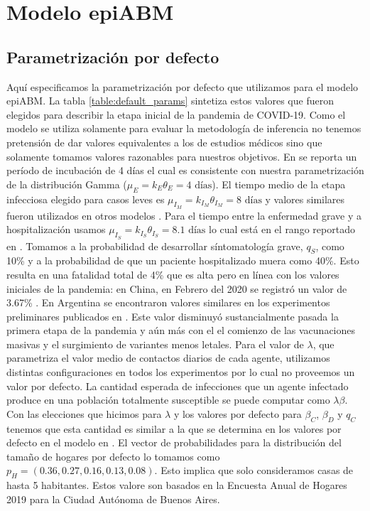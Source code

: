 \chapter{Modelo epiABM}
\section{Parametrización por defecto}\label{appendix:epi_abm_default_params}

Aquí especificamos la parametrización por defecto que utilizamos para el modelo epiABM. La tabla \ref{table:default_params} sintetiza estos valores que fueron elegidos para describir la etapa inicial de la pandemia de COVID-19. Como el modelo se utiliza solamente para evaluar la metodología de inferencia no tenemos pretensión de dar valores equivalentes a los de estudios médicos sino que solamente tomamos valores razonables para nuestros objetivos. En \cite{Guan2020} se reporta un período de incubación de 4 días el cual es consistente con nuestra parametrización de la distribución Gamma ($\mu_E = k_E \theta_E = 4\text{ días}$). El tiempo medio de la etapa infecciosa elegido para casos leves es $\mu_{I_M} = k_{I_M} \theta_{I_M} = 8 \text{ días}$ y valores similares fueron utilizados en otros modelos \citep{Zhao2020, Ivorra2020}. Para el tiempo entre la enfermedad grave y a hospitalización usamos $\mu_{I_S} = k_{I_S} \theta_{I_S} = 8.1 \text{ días}$ lo cual está en el rango reportado en \cite{Faes2020}. Tomamos a la probabilidad de desarrollar síntomatología grave, $q_S$, como 10\% y a la probabilidad de que un paciente hospitalizado muera como 40\%. Esto resulta en una fatalidad total de 4\% que es alta pero en línea con los valores iniciales de la pandemia: en China, en Febrero del 2020 se registró un valor de 3.67\% \citep{Verity2020}. En Argentina se encontraron valores similares en los experimentos preliminares publicados en \cite{Evensen2020}. Este valor disminuyó sustancialmente pasada la primera etapa de la pandemia y aún más con el el comienzo de las vacunaciones masivas y el surgimiento de variantes menos letales. Para el valor de $\lambda$, que parametriza el valor medio de contactos diarios de cada agente, utilizamos distintas configuraciones en todos los experimentos por lo cual no proveemos un valor por defecto. La cantidad esperada de infecciones que un agente infectado produce en una población totalmente susceptible se puede computar como $\lambda \beta$. Con las elecciones que hicimos para $\lambda$ y los valores por defecto para $\beta_C$, $\beta_D$ y $q_C$ tenemos que esta cantidad es similar a la que se determina en los valores por defecto en el modelo en \cite{Kerr2020}. El vector de probabilidades para la distribución del tamaño de hogares por defecto lo tomamos como $p_H = (0.36, 0.27, 0.16, 0.13, 0.08)$. Esto implica que solo consideramos casas de hasta 5 habitantes. Estos valore son basados en la Encuesta Anual de Hogares 2019 para la Ciudad Autónoma de Buenos Aires.

